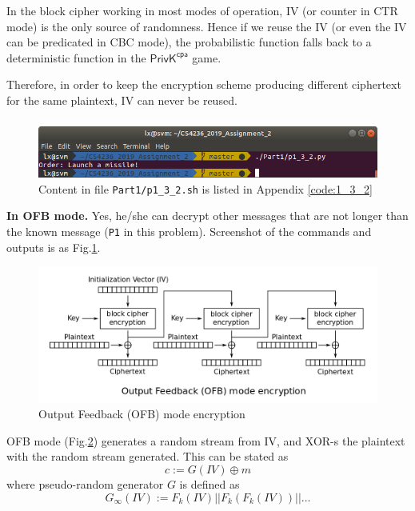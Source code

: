 In the block cipher working in most modes of operation, IV (or counter in CTR mode) is the only source of randomness.
Hence if we reuse the IV (or even the IV can be predicated in CBC mode), the probabilistic function falls back to a deterministic function in the $\mathsf{PrivK}^{\mathsf{cpa}}$ game.

Therefore, in order to keep the encryption scheme producing different ciphertext for the same plaintext, IV can never be reused.

\subsubsection{}

\begin{figure}[tb!]
\centering
\includegraphics[width=\columnwidth]{pictures/p1_3_2.png}
\caption{
    Content in file \texttt{Part1/p1\_3\_2.sh} is listed in Appendix \ref{code:1_3_2}
}
\label{fig:p1_3_2}
\end{figure}

\textbf{In OFB mode.}
Yes, he/she can decrypt other messages that are not longer than the known message (\texttt{P1} in this problem). Screenshot of the commands and outputs is as Fig.\ref{fig:p1_3_2}.

\begin{figure}[ht!]
\centering
\includegraphics[width=\columnwidth]{pictures/OFB_encryption.png}
\caption{
    Output Feedback (OFB) mode encryption
}
\label{fig:OFB_encryption}
\end{figure}

OFB mode (Fig.\ref{fig:OFB_encryption}) generates a random stream from IV, and XOR-s the plaintext with the random stream generated. 
This can be stated as $$ c := G(IV) \oplus m $$ where pseudo-random generator $G$ is defined as $$
G_\infty(IV) := F_k(IV) || F_k(F_k(IV)) || \ldots
$$

